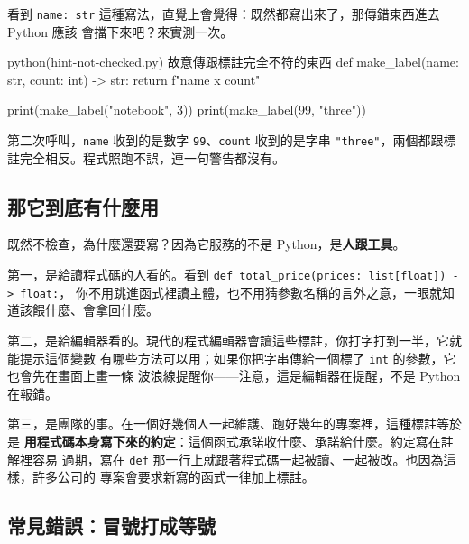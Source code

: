 看到 \texttt{name: str} 這種寫法，直覺上會覺得：既然都寫出來了，那傳錯東西進去 Python 應該
會擋下來吧？來實測一次。

\begin{example}{python}{(hint-not-checked.py) 故意傳跟標註完全不符的東西}
def make_label(name: str, count: int) -> str:
    return f"{name} x {count}"


print(make_label("notebook", 3))
print(make_label(99, "three"))
\end{example}


第二次呼叫，\texttt{name} 收到的是數字 \texttt{99}、\texttt{count} 收到的是字串
\texttt{"three"}，兩個都跟標註完全相反。程式照跑不誤，連一句警告都沒有。


\subsection*{那它到底有什麼用}

既然不檢查，為什麼還要寫？因為它服務的不是 Python，是\textbf{人跟工具}。

第一，是給讀程式碼的人看的。看到 \texttt{def total\_price(prices: list[float]) -> float:}，
你不用跳進函式裡讀主體，也不用猜參數名稱的言外之意，一眼就知道該餵什麼、會拿回什麼。

第二，是給編輯器看的。現代的程式編輯器會讀這些標註，你打字打到一半，它就能提示這個變數
有哪些方法可以用；如果你把字串傳給一個標了 \texttt{int} 的參數，它也會先在畫面上畫一條
波浪線提醒你——注意，這是編輯器在提醒，不是 Python 在報錯。

第三，是團隊的事。在一個好幾個人一起維護、跑好幾年的專案裡，這種標註等於是
\textbf{用程式碼本身寫下來的約定}：這個函式承諾收什麼、承諾給什麼。約定寫在註解裡容易
過期，寫在 \texttt{def} 那一行上就跟著程式碼一起被讀、一起被改。也因為這樣，許多公司的
專案會要求新寫的函式一律加上標註。

\subsection*{常見錯誤：冒號打成等號}

